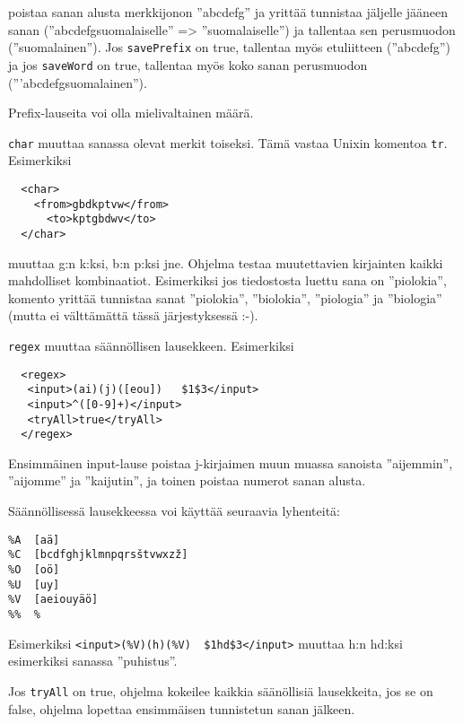 \documentclass[12pt]{article}
\begin{document}
poistaa sanan alusta merkkijonon ''abcdefg'' ja yrittää tunnistaa
jäljelle jääneen sanan (''abcdefgsuomalaiselle'' => ''suomalaiselle'')
ja tallentaa sen perusmuodon (''suomalainen''). Jos \verb|savePrefix|
on true, tallentaa myös etuliitteen (''abcdefg'') ja jos
\verb|saveWord| on true, tallentaa myös koko sanan perusmuodon
('''abcdefgsuomalainen'').

Prefix-lauseita voi olla mielivaltainen määrä.



\bigskip
\verb|char| muuttaa sanassa olevat merkit toiseksi. Tämä vastaa Unixin
komentoa \verb|tr|. Esimerkiksi

\begin{verbatim}
  <char>
    <from>gbdkptvw</from>
      <to>kptgbdwv</to>
  </char>
\end{verbatim}

muuttaa g:n k:ksi, b:n p:ksi jne. Ohjelma testaa muutettavien
kirjainten kaikki mahdolliset kombinaatiot. Esimerkiksi jos
tiedostosta luettu sana on ''piolokia'', komento yrittää tunnistaa
sanat ''piolokia'', ''biolokia'', ''piologia'' ja ''biologia'' (mutta
ei välttämättä tässä järjestyksessä :-).




\verb|regex| muuttaa säännöllisen lausekkeen. Esimerkiksi

\begin{verbatim}
  <regex>
   <input>(ai)(j)([eou])   $1$3</input>
   <input>^([0-9]+)</input>
   <tryAll>true</tryAll>
  </regex>
\end{verbatim}

Ensimmäinen input-lause poistaa j-kirjaimen muun muassa sanoista
''aijemmin'', ''aijomme'' ja ''kaijutin'', ja toinen poistaa numerot
sanan alusta.


Säännöllisessä lausekkeessa voi käyttää seuraavia lyhenteitä:

\begin{verbatim}
%A  [aä]
%C  [bcdfghjklmnpqrsštvwxzž]
%O  [oö]
%U  [uy]
%V  [aeiouyäö]
%%  %
\end{verbatim}

Esimerkiksi \verb=<input>(%V)(h)(%V)  $1hd$3</input>=
muuttaa h:n hd:ksi esimerkiksi sanassa ''puhistus''.


Jos \verb=tryAll= on true, ohjelma kokeilee kaikkia säänöllisiä
lausekkeita, jos se on false, ohjelma lopettaa ensimmäisen tunnistetun
sanan jälkeen.
\end{document}
